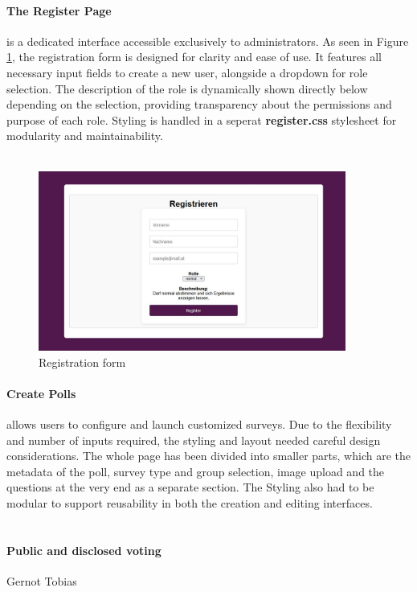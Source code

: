 \documentclass[a4paper,12pt]{report}
\begin{document}
\paragraph{The Register Page} is a dedicated interface accessible exclusively to administrators. As seen in Figure \ref{fig:register_view}, the registration form is designed for clarity and ease of use. It features all necessary input fields to create a new user, alongside a dropdown for role selection. The description of the role is dynamically shown directly below depending on the selection, providing transparency about the permissions and purpose of each role. Styling is handled in a seperat \textbf{register.css} stylesheet for modularity and maintainability.\\\\ 
\begin{figure}[H]
\centering
\includegraphics[width=0.9\textwidth]{pics/register_view.jpg}
\caption{Registration form}
\label{fig:register_view}
\end{figure}
\paragraph{Create Polls} allows users to configure and launch customized surveys. Due to the flexibility and number of inputs required, the styling and layout needed careful design considerations. The whole page has been divided into smaller parts, which are the metadata of the poll, survey type and group selection, image upload and the questions at the very end as a separate section. The Styling also had to be modular to support reusability in both the creation and editing interfaces.\\\\
\paragraph{Public and disclosed voting} Gernot Tobias
\end{document}
